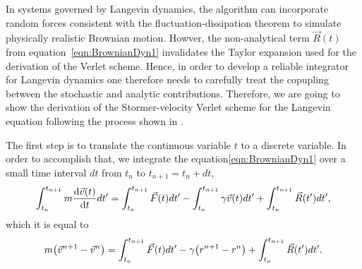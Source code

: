 In systems governed by Langevin dynamics, the algorithm can incorporate random forces consistent with the fluctuation-dissipation theorem to simulate physically realistic Brownian motion.
Howver, the non-analytical term $\vec{R}(t)$ from equation~\eqref{eqn:BrownianDyn1} invalidates the Taylor expansion used for the derivation of the Verlet scheme.
Hence, in order to develop a reliable integrator for Langevin dynamics one therefore needs to carefully treat the copupling between the stochastic and analytic contributions.
Therefore, we are going to show the derivation of the Stormer-velocity Verlet scheme for the Langevin equation following the process shown in \citep{gronbech-jensenSimpleEffectiveVerlettype2013a}.

The first step is to translate the continuous variable $t$ to a discrete variable.
In order to accomplish that, we integrate the equation\eqref{eqn:BrownianDyn1} over a small time interval $dt$ from $t_n$ to $t_{n+1}=t_{n}+dt$,
\begin{align}
    \int_{t_n}^{t_{n+1}}m\dv{\vec{v}(t)}{t}dt'
    =
    \int_{t_n}^{t_{n+1}}\vec{F}(t)dt'
    -\int_{t_n}^{t_{n+1}}\gamma\vec{v}(t)dt'
    +\int_{t_n}^{t_{n+1}}\vec{R}(t')dt',
\end{align}
which it is equal to
\begin{align}
    m\qty(\vec{v}^{n+1} - \vec{v}^{n})
    =
    \int_{t_n}^{t_{n+1}}\vec{F}(t)dt'
    -\gamma\qty(r^{n+1}-r^n)
    +\int_{t_n}^{t_{n+1}}\vec{R}(t')dt'\label{eqn:DerVelVerlet1}.
\end{align}

